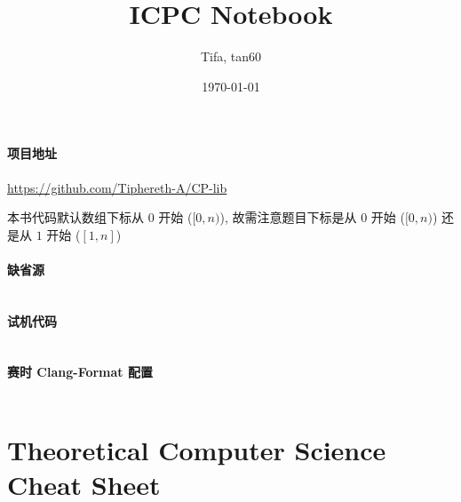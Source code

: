 \documentclass{ICPCnotebook}
\title{\vspace{-4ex}\Large{ICPC Notebook}}
\author{Tifa, tan60}
\date{\today}
\begin{document}
    \maketitle

    \pagestyle{plain}

	\setcounter{page}{1}

    \paragraph{项目地址} \url{https://github.com/Tiphereth-A/CP-lib}

    本书代码默认数组下标从 \(0\) 开始 (\([0, n)\)), 故需注意题目下标是从 \(0\) 开始 (\([0, n)\)) 还是从 \(1\) 开始 (\([1, n]\))

    \paragraph{缺省源}

    \inputminted{cpp}{src/src/main.cpp}

    \paragraph{试机代码}

    \inputminted{cpp}{src/src/test.cpp}

    \paragraph{赛时 Clang-Format 配置}
    
    \inputminted{yaml}{src/src/.clang-format}

    \newpage
    \begin{multicols}{2}
        \tableofcontents
    \end{multicols}

    \newpage
	\pagestyle{fancy}
	\setcounter{page}{1}

    
    

    \section{Theoretical Computer Science Cheat Sheet}
    \label{sec:theoretical-computer-science-cheat-sheet}

    
    
\end{document}
